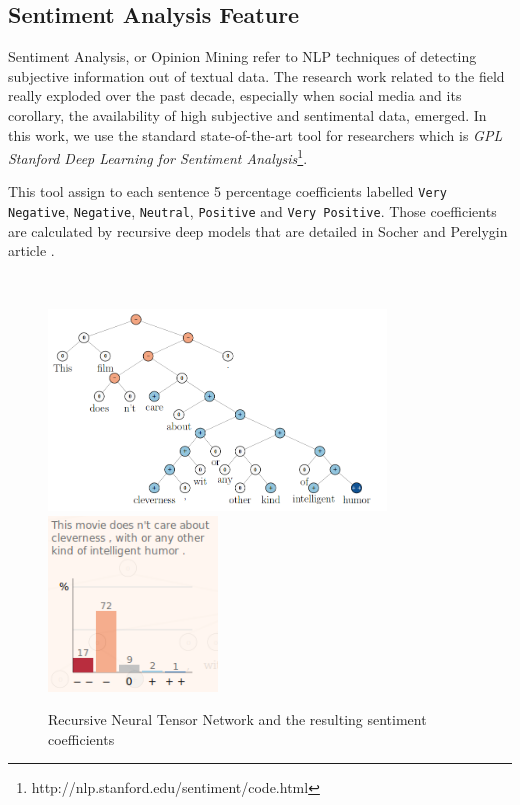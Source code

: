 \subsection{Sentiment Analysis Feature}
Sentiment Analysis, or Opinion Mining refer to NLP techniques of detecting subjective information out of textual data. The research work related to the field really exploded over the past decade, especially when social media and its corollary, the availability of high subjective and sentimental data, emerged. In this work, we use the standard state-of-the-art tool for researchers which is \emph{GPL Stanford Deep Learning for Sentiment Analysis}\footnote{http://nlp.stanford.edu/sentiment/code.html}. 

This tool assign to each sentence 5 percentage coefficients labelled \texttt{Very Negative}, \texttt{Negative}, \texttt{Neutral}, \texttt{Positive} and \texttt{Very Positive}. Those coefficients are calculated by recursive deep models that are detailed in Socher and Perelygin article \cite{Socher_recursivedeep}.

\
\begin{figure}[H]
    \centering
    \includegraphics[width=0.8\textwidth]{fig/sentimenttree.png}
    \includegraphics[width=0.4\textwidth]{fig/sentimentcoeff.png}
    \caption[Short caption]{ Recursive Neural Tensor Network and the resulting sentiment coefficients}
    \label{fig:sentcoeff}
\end{figure}

